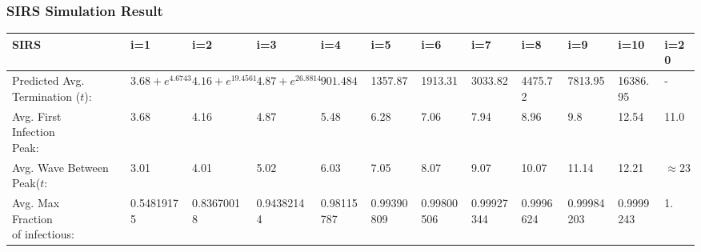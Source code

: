 \documentclass{subfile}
\begin{document}
  \subsubsection{SIRS Simulation Result}
  \begin{adjustbox}{max width=1.2\textwidth,center}
    \begin{tabular}{|l|l|l|l|l|l|l|l|l|l|l|l|}
      \hline
      SIRS & i=1 & i=2 & i=3 & i=4 & i=5 & i=6 & i=7 & i=8 & i=9 & i=10 & i=20\\
      \hline
      \makecell{Predicted\\Avg.\\Termination\\(\(t\))}\footnotemark: & \(3.68 + e^{4.6743}\) & \(4.16 + e^{19.4561}\) & \(4.87 + e^{26.8814}\) & \(901.4842\) & 1357.87 & 1913.31 & 3033.82 & 4475.72 & 7813.95 & 16386.95 & -\footnotemark\\
      \hline
      \makecell{Avg. First\\Infection\\Peak:} & 3.68 & 4.16 & 4.87 & 5.48 & 6.28 & 7.06 & 7.94 & 8.96 & 9.8 & 12.54 & 11.0\footnotemark\\
      \hline
      \makecell{Avg. Wave\\Between Peak(\(t\):} & 3.01 & 4.01 & 5.02 & 6.03 & 7.05 & 8.07 & 9.07 & 10.07 & 11.14 & 12.21 & \(\approx 23\)\footnotemark\\
      \hline
      \makecell{Avg. Max\\Fraction\\of infectious:} & 0.54819175& 0.83670018& 0.94382144& 0.98115787& 0.99390809& 0.99800506& 0.99927344& 0.9996624&  0.99984203& 0.9999243&  1.\\
      \hline
    \end{tabular}
  \end{adjustbox}
\end{document}

